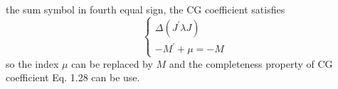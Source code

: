 \begin{exercise}
\begin{equation}
    \end{equation}
    the sum symbol in fourth equal sign, the CG coefficient satisfies
    \begin{equation*}
        \left\{
            \begin{array}{c}
                \Delta(J^{\prime} \lambda J) \\
                -M^{\prime} + \mu = -M
            \end{array}
        \right.
    \end{equation*}
    so the index $\mu$ can be replaced by $M$ and the completeness
    property of CG coefficient Eq. 1.28 can be use.
    \label{exer-suhonen:ex2-25}
\end{exercise}


